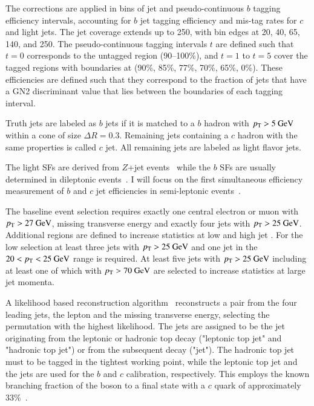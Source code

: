 The corrections are applied in bins of jet \pt and pseudo-continuous
$b$ tagging efficiency intervals, accounting for $b$ jet tagging efficiency
and mis-tag rates for $c$ and light jets. 
The jet \pt coverage extends up to 250\GeV, 
with bin edges at 20, 40, 65, 140, and 250\GeV.
The pseudo-continuous tagging intervals $t$
are defined such that $t=0$ corresponds to the untagged region (90–100\%),
and $t=1$ to $t=5$ cover the tagged regions with boundaries at 
(90\%, 85\%, 77\%, 70\%, 65\%, 0\%). 
These efficiencies are defined such that they correspond to the fraction of jets that
have a GN2 discriminant value that lies between the boundaries of each tagging interval.

Truth jets are labeled as $b$ jets if it is matched to a $b$ hadron with $p_{\text{T}} > 5 ~\text{GeV}$ within a cone of size $\Delta R = 0.3$.
Remaining jets containing a $c$ hadron with the same properties is called $c$ jet.
All remaining jets are labeled as light flavor jets.

The light SFs are derived from $Z$+jet events~\cite{FTAG-2019-02} while the
$b$ SFs are usually determined in dileptonic \ttbar events~\cite{bjetcalib}.
I will focus on the first simultaneous efficiency measurement of $b$ and $c$ jet efficiencies in semi-leptonic \ttbar events~\cite{cbjetcalib}.

The baseline event selection requires exactly one central electron or muon with $p_{\text{T}} > 27 ~\text{GeV}$, missing transverse energy
and exactly four jets with $p_{\text{T}} > 25 ~\text{GeV}$.
Additional regions are defined to increase statistics at low and high jet \pt.
For the low \pt selection at least three jets with $p_{\text{T}} > 25 ~\text{GeV}$ and one jet in the $20<p_{\text{T}}<25~\text{GeV}$ range is required.
At least five jets with $p_{\text{T}} > 25 ~\text{GeV}$ including at least one of which with $p_{\text{T}} > 70 ~\text{GeV}$ are selected to increase statistics at large jet momenta.

A likelihood based reconstruction algorithm~\cite{ERDMANN201418} reconstructs a \ttbar pair from the four leading jets, the lepton and the missing transverse energy, selecting
the permutation with the highest likelihood.
The jets are assigned to be the jet originating from the leptonic or hadronic top decay ("leptonic top jet" and "hadronic top jet") or from the subsequent \Wboson decay ("\Wboson jet"). 
The hadronic top jet must to be tagged in the tightest working point, while the leptonic top jet and the \Wboson jets are used for the $b$ and $c$ calibration, respectively.
This employs the known branching fraction of
the \Wboson boson to a final state with a $c$ quark of approximately 33\%~\cite{PDG}.

